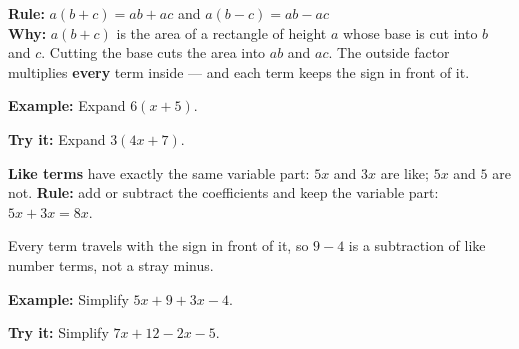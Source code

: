 \documentclass[12pt]{article}
\begin{document}


\begin{formulabox}
\textbf{Rule:} \quad $a(b + c) = ab + ac$ \quad and \quad $a(b - c) = ab - ac$\\[3pt]
\textbf{Why:} $a(b+c)$ is the area of a rectangle of height $a$ whose base is cut
into $b$ and $c$. Cutting the base cuts the area into $ab$ and $ac$.
The outside factor multiplies \textbf{every} term inside --- and each term keeps
the sign in front of it.
\end{formulabox}

\begin{examplebox}
\textbf{Example:} \quad Expand $6(x + 5)$.
\end{examplebox}

\begin{tryitbox}
\textbf{Try it:} \quad Expand $3(4x + 7)$.\\[2pt]
\end{tryitbox}


\begin{formulabox}
\textbf{Like terms} have exactly the same variable part: $5x$ and $3x$ are like;
$5x$ and $5$ are not. \quad \textbf{Rule:} add or subtract the coefficients and
keep the variable part: $5x + 3x = 8x$.\par
Every term travels with the sign in front of it, so $9 - 4$ is a subtraction of
like number terms, not a stray minus.
\end{formulabox}

\begin{examplebox}
\textbf{Example:} \quad Simplify $5x + 9 + 3x - 4$.
\end{examplebox}

\begin{tryitbox}
\textbf{Try it:} \quad Simplify $7x + 12 - 2x - 5$.\\[2pt]
\end{tryitbox}
\end{document}
